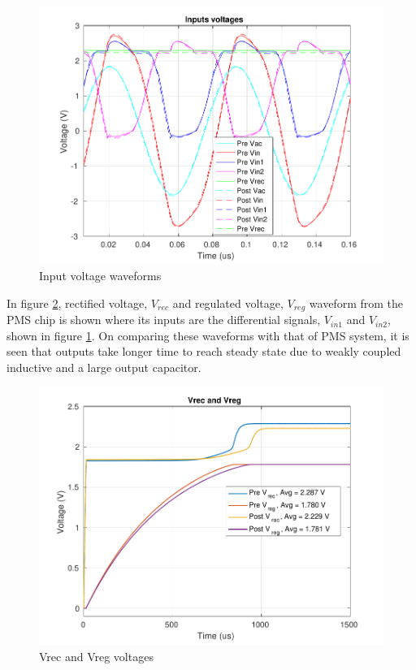 \documentclass[12pt,a4paper,UKenglish]{report}
\begin{document}
\begin{figure} [!htb]
  \centering
  \includegraphics[width=\textwidth]{img/wpt/wpt_inputs_both.pdf} 
 \caption{Input voltage waveforms} 
\label{fig:wpt_vin} 
\end{figure}

In figure \ref{fig:wpt_vout}, rectified voltage, $V_{rec}$ and regulated voltage, $V_{reg}$ waveform from the PMS chip is 
shown where its inputs are the differential signals, $V_{in1}$ and $V_{in2}$, shown in figure \ref{fig:wpt_vin}. On 
comparing these waveforms with that of PMS system, it is seen that outputs take longer time to reach steady state due to 
weakly coupled inductive and a large output capacitor. \\

\begin{figure} [!htb]
  \centering
  \includegraphics[width=\textwidth]{img/wpt/wpt_Vout_both.pdf} 
 \caption{Vrec and Vreg voltages} 
\label{fig:wpt_vout} 
\end{figure}
\end{document}
